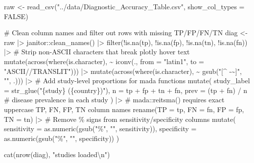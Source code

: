 \documentclass[
  letterpaper,
  DIV=11,
  numbers=noendperiod]{scrartcl}
\newenvironment{Shaded}{\begin{snugshade}}{\end{snugshade}}
\newcommand{\AttributeTok}[1]{\textcolor[rgb]{0.40,0.45,0.13}{#1}}
\newcommand{\CommentTok}[1]{\textcolor[rgb]{0.37,0.37,0.37}{#1}}
\newcommand{\ConstantTok}[1]{\textcolor[rgb]{0.56,0.35,0.01}{#1}}
\newcommand{\FunctionTok}[1]{\textcolor[rgb]{0.28,0.35,0.67}{#1}}
\newcommand{\NormalTok}[1]{\textcolor[rgb]{0.00,0.23,0.31}{#1}}
\newcommand{\OtherTok}[1]{\textcolor[rgb]{0.00,0.23,0.31}{#1}}
\newcommand{\SpecialCharTok}[1]{\textcolor[rgb]{0.37,0.37,0.37}{#1}}
\newcommand{\StringTok}[1]{\textcolor[rgb]{0.13,0.47,0.30}{#1}}
\begin{document}
\begin{Shaded}
\begin{Highlighting}[]
\NormalTok{raw }\OtherTok{\textless{}{-}} \FunctionTok{read\_csv}\NormalTok{(}\StringTok{"../data/Diagnostic\_Accuracy\_Table.csv"}\NormalTok{, }\AttributeTok{show\_col\_types =} \ConstantTok{FALSE}\NormalTok{)}

\CommentTok{\# Clean column names and filter out rows with missing TP/FP/FN/TN}
\NormalTok{diag }\OtherTok{\textless{}{-}}\NormalTok{ raw }\SpecialCharTok{|\textgreater{}}
\NormalTok{  janitor}\SpecialCharTok{::}\FunctionTok{clean\_names}\NormalTok{() }\SpecialCharTok{|\textgreater{}}
  \FunctionTok{filter}\NormalTok{(}\SpecialCharTok{!}\FunctionTok{is.na}\NormalTok{(tp), }\SpecialCharTok{!}\FunctionTok{is.na}\NormalTok{(fp), }\SpecialCharTok{!}\FunctionTok{is.na}\NormalTok{(tn), }\SpecialCharTok{!}\FunctionTok{is.na}\NormalTok{(fn)) }\SpecialCharTok{|\textgreater{}}
  \CommentTok{\# Strip non{-}ASCII characters that break plotly hover text}
  \FunctionTok{mutate}\NormalTok{(}\FunctionTok{across}\NormalTok{(}\FunctionTok{where}\NormalTok{(is.character), }\SpecialCharTok{\textasciitilde{}} \FunctionTok{iconv}\NormalTok{(., }\AttributeTok{from =} \StringTok{"latin1"}\NormalTok{, }\AttributeTok{to =} \StringTok{"ASCII//TRANSLIT"}\NormalTok{))) }\SpecialCharTok{|\textgreater{}}
  \FunctionTok{mutate}\NormalTok{(}\FunctionTok{across}\NormalTok{(}\FunctionTok{where}\NormalTok{(is.character), }\SpecialCharTok{\textasciitilde{}} \FunctionTok{gsub}\NormalTok{(}\StringTok{"[\^{} {-}\textasciitilde{}]"}\NormalTok{, }\StringTok{""}\NormalTok{, .))) }\SpecialCharTok{|\textgreater{}}
  \CommentTok{\# Add study{-}level proportions for mada functions}
  \FunctionTok{mutate}\NormalTok{(}
    \AttributeTok{study\_label =} \FunctionTok{str\_glue}\NormalTok{(}\StringTok{"\{study\} (\{country\})"}\NormalTok{),}
    \AttributeTok{n =}\NormalTok{ tp }\SpecialCharTok{+}\NormalTok{ fp }\SpecialCharTok{+}\NormalTok{ tn }\SpecialCharTok{+}\NormalTok{ fn,}
    \AttributeTok{prev =}\NormalTok{ (tp }\SpecialCharTok{+}\NormalTok{ fn) }\SpecialCharTok{/}\NormalTok{ n       }\CommentTok{\# disease prevalence in each study}
\NormalTok{  ) }\SpecialCharTok{|\textgreater{}}
  \CommentTok{\# mada::reitsma() requires exact uppercase TP, FN, FP, TN column names}
  \FunctionTok{rename}\NormalTok{(}\AttributeTok{TP =}\NormalTok{ tp, }\AttributeTok{FN =}\NormalTok{ fn, }\AttributeTok{FP =}\NormalTok{ fp, }\AttributeTok{TN =}\NormalTok{ tn) }\SpecialCharTok{|\textgreater{}}
  \CommentTok{\# Remove \% signs from sensitivity/specificity columns}
  \FunctionTok{mutate}\NormalTok{(}
    \AttributeTok{sensitivity =} \FunctionTok{as.numeric}\NormalTok{(}\FunctionTok{gsub}\NormalTok{(}\StringTok{"\%"}\NormalTok{, }\StringTok{""}\NormalTok{, sensitivity)),}
    \AttributeTok{specificity =} \FunctionTok{as.numeric}\NormalTok{(}\FunctionTok{gsub}\NormalTok{(}\StringTok{"\%"}\NormalTok{, }\StringTok{""}\NormalTok{, specificity))}
\NormalTok{  )}

\FunctionTok{cat}\NormalTok{(}\FunctionTok{nrow}\NormalTok{(diag), }\StringTok{"studies loaded}\SpecialCharTok{\textbackslash{}n}\StringTok{"}\NormalTok{)}
\end{Highlighting}
\end{Shaded}
\end{document}
